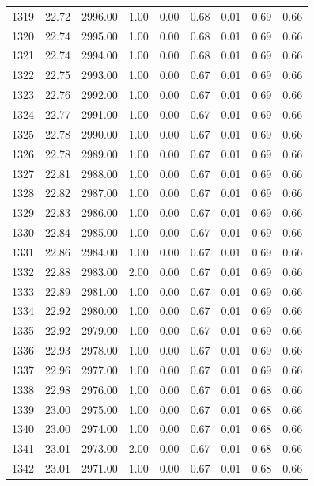 \documentclass{article}\usepackage[]{graphicx}\usepackage[]{color}
\begin{document}
\begin{longtable}{rrrrrrrrr}
  1319 & 22.72 & 2996.00 & 1.00 & 0.00 & 0.68 & 0.01 & 0.69 & 0.66 \\ 
  1320 & 22.74 & 2995.00 & 1.00 & 0.00 & 0.68 & 0.01 & 0.69 & 0.66 \\ 
  1321 & 22.74 & 2994.00 & 1.00 & 0.00 & 0.68 & 0.01 & 0.69 & 0.66 \\ 
  1322 & 22.75 & 2993.00 & 1.00 & 0.00 & 0.67 & 0.01 & 0.69 & 0.66 \\ 
  1323 & 22.76 & 2992.00 & 1.00 & 0.00 & 0.67 & 0.01 & 0.69 & 0.66 \\ 
  1324 & 22.77 & 2991.00 & 1.00 & 0.00 & 0.67 & 0.01 & 0.69 & 0.66 \\ 
  1325 & 22.78 & 2990.00 & 1.00 & 0.00 & 0.67 & 0.01 & 0.69 & 0.66 \\ 
  1326 & 22.78 & 2989.00 & 1.00 & 0.00 & 0.67 & 0.01 & 0.69 & 0.66 \\ 
  1327 & 22.81 & 2988.00 & 1.00 & 0.00 & 0.67 & 0.01 & 0.69 & 0.66 \\ 
  1328 & 22.82 & 2987.00 & 1.00 & 0.00 & 0.67 & 0.01 & 0.69 & 0.66 \\ 
  1329 & 22.83 & 2986.00 & 1.00 & 0.00 & 0.67 & 0.01 & 0.69 & 0.66 \\ 
  1330 & 22.84 & 2985.00 & 1.00 & 0.00 & 0.67 & 0.01 & 0.69 & 0.66 \\ 
  1331 & 22.86 & 2984.00 & 1.00 & 0.00 & 0.67 & 0.01 & 0.69 & 0.66 \\ 
  1332 & 22.88 & 2983.00 & 2.00 & 0.00 & 0.67 & 0.01 & 0.69 & 0.66 \\ 
  1333 & 22.89 & 2981.00 & 1.00 & 0.00 & 0.67 & 0.01 & 0.69 & 0.66 \\ 
  1334 & 22.92 & 2980.00 & 1.00 & 0.00 & 0.67 & 0.01 & 0.69 & 0.66 \\ 
  1335 & 22.92 & 2979.00 & 1.00 & 0.00 & 0.67 & 0.01 & 0.69 & 0.66 \\ 
  1336 & 22.93 & 2978.00 & 1.00 & 0.00 & 0.67 & 0.01 & 0.69 & 0.66 \\ 
  1337 & 22.96 & 2977.00 & 1.00 & 0.00 & 0.67 & 0.01 & 0.69 & 0.66 \\ 
  1338 & 22.98 & 2976.00 & 1.00 & 0.00 & 0.67 & 0.01 & 0.68 & 0.66 \\ 
  1339 & 23.00 & 2975.00 & 1.00 & 0.00 & 0.67 & 0.01 & 0.68 & 0.66 \\ 
  1340 & 23.00 & 2974.00 & 1.00 & 0.00 & 0.67 & 0.01 & 0.68 & 0.66 \\ 
  1341 & 23.01 & 2973.00 & 2.00 & 0.00 & 0.67 & 0.01 & 0.68 & 0.66 \\ 
  1342 & 23.01 & 2971.00 & 1.00 & 0.00 & 0.67 & 0.01 & 0.68 & 0.66 \\ 

\end{longtable}
\end{document}
